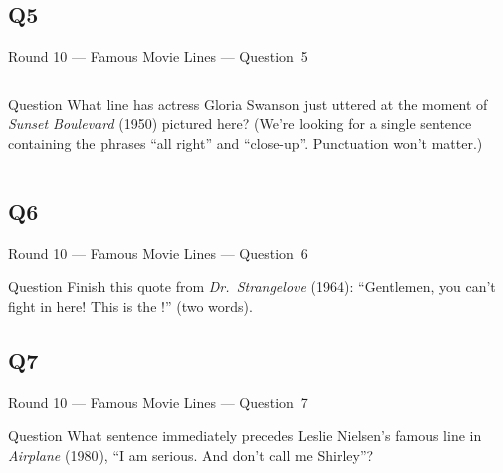\documentclass[11pt]{beamer}
\begin{document}
\subsection*{Q5}
\begin{frame}[t]{Round 10 --- Famous Movie Lines --- \mbox{Question 5}}
\vspace{-0.5em}
\begin{columns}[T,totalwidth=\linewidth]
\begin{column}{0.52\linewidth}
\begin{block}{Question}
What line has actress Gloria Swanson just uttered at the moment of \emph{Sunset Boulevard} (1950) pictured here? (We're looking for a single sentence containing the phrases ``all right'' and ``close-up''. Punctuation won't matter.)
\end{block}
\end{column}
\begin{column}{0.45\linewidth}
\begin{center}
\texttt{[image: \{Images/demille]}.jpg}
\end{center}
\end{column}
\end{columns}
\end{frame}
\subsection*{Q6}
\begin{frame}[t]{Round 10 --- Famous Movie Lines --- \mbox{Question 6}}
\vspace{-0.5em}
\begin{block}{Question}
Finish this quote from \emph{Dr.\ Strangelove} (1964): ``Gentlemen, you can't fight in here! This is the \textunderscore{}\textunderscore{}\textunderscore{}\textunderscore{}\textunderscore{} \textunderscore{}\textunderscore{}\textunderscore{}\textunderscore{}\textunderscore{}!'' (two words).
\end{block}
\end{frame}
\subsection*{Q7}
\begin{frame}[t]{Round 10 --- Famous Movie Lines --- \mbox{Question 7}}
\vspace{-0.5em}
\begin{block}{Question}
What sentence immediately precedes Leslie Nielsen's famous line in \emph{Airplane} (1980), ``I am serious. And don't call me Shirley''?
\end{block}
\end{frame}
\end{document}
